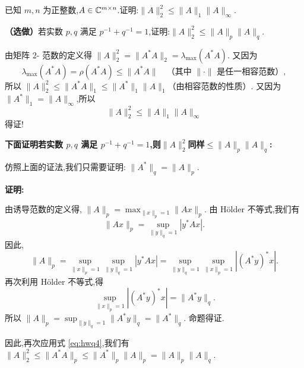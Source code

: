 \begin{problem}
已知 $m,n$ 为正整数,$A\in\mathbb{C}^{m\times n}$.证明:$\|A\|_2^2\le\|A\|_1\|A\|_{\infty}$.

\textbf{（选做）}若实数 $p,q$ 满足 $p^{-1}+q^{-1}=1$,证明:$\|A\|_2^2\le\|A\|_p\|A\|_q$.
\begin{solution}
    由矩阵 2- 范数的定义得 $\|A\|_2^2 = \|A^*A\|_2 = \lambda_{\max}(A^*A)$. 又因为
    \begin{equation*}\label{eq:hwq4}
        \lambda_{\max}(A^*A) = \rho(A^*A) \le \|A^*A\| \quad \text{（其中 $\|\cdot\|$ 是任一相容范数）}, \tag{1}
    \end{equation*}
    所以 $\|A\|_2^2 \le \|A^*A\|_1 \le \|A^*\|_1\|A\|_1$（由相容范数的性质）. 又因为 $\|A^*\|_1 = \|A\|_{\infty}$,所以
    \[
        \|A\|_2^2\le\|A\|_1\|A\|_{\infty}
    \]
    得证!

    \textbf{下面证明若实数 $p,q$ 满足 $p^{-1}+q^{-1}=1$,则$\|A\|_2^2$同样$\le\|A\|_p\|A\|_q$:}

    仿照上面的证法,我们只需要证明: $\|A^*\|_q = \|A\|_p$.

    \textbf{证明:}

    由诱导范数的定义得, $\|A\|_p = \max_{\|x\|_p=1} \|Ax\|_p$.
    由 Hölder 不等式,我们有
    \[
        \|Ax\|_p = \sup_{\|y\|_q=1} |y^*Ax|.
    \]
    因此,
    \[
        \|A\|_p = \sup_{\|x\|_p=1} \sup_{\|y\|_q=1} |y^*Ax| = \sup_{\|y\|_q=1} \sup_{\|x\|_p=1} |(A^*y)^*x|.
    \]
    再次利用 Hölder 不等式,得
    \[
        \sup_{\|x\|_p=1} |(A^*y)^*x| = \|A^*y\|_q.
    \]
    所以 $\|A\|_p = \sup_{\|y\|_q=1} \|A^*y\|_q = \|A^*\|_q$.
    命题得证.

    因此,再次应用式 \eqref{eq:hwq4},我们有 $\|A\|_2^2 \le \|A^*A\|_p \le \|A^*\|_p\|A\|_p = \|A\|_p\|A\|_q$.
\end{solution}
\end{problem}

